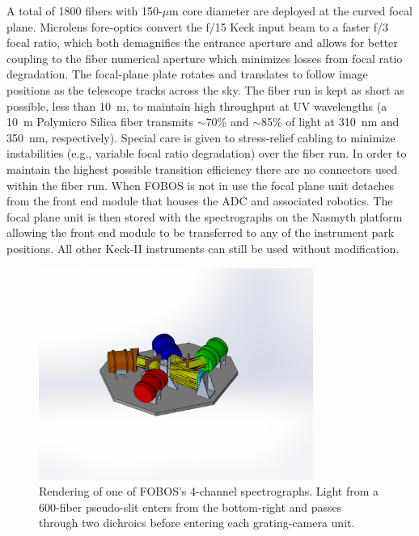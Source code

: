 A total of 1800 fibers with 150-$\mu$m core diameter are deployed at the
curved focal plane. Microlens fore-optics convert the f/15 Keck input
beam to a faster f/3 focal ratio, which both demagnifies the entrance
aperture and allows for better coupling to the fiber numerical aperture
which minimizes losses from focal ratio degradation.  The focal-plane
plate rotates and translates to follow image positions as the telescope
tracks across the sky. The fiber run is kept as short as possible, less
than 10~m, to maintain high throughput at UV wavelengths (a 10~m
Polymicro Silica fiber transmits $\sim$70\% and $\sim$85\% of light at
310~nm and 350~nm, respectively). Special care is given to stress-relief
cabling to minimize instabilities (e.g., variable focal ratio
degradation) over the fiber run. In order to maintain the highest
possible transition efficiency there are no connectors used within the
fiber run.  When FOBOS is not in use the focal plane unit detaches from
the front end module that houses the ADC and associated robotics.  The
focal plane unit is then stored with the spectrographs on the Nasmyth
platform allowing the front end module to be transferred to any of the
instrument park positions.  All other Keck-II instruments can still be
used without modification.

\begin{figure}[h!]
\vskip -0.1in
\includegraphics[width=0.8\textwidth]{figs/FOBOS_SPEC_V2.PDF}
\caption{\small Rendering of one of FOBOS's 4-channel spectrographs.
Light from a 600-fiber pseudo-slit enters from the bottom-right and
passes through two dichroics before entering each grating-camera unit.}
\label{fig:spectrograph}
\end{figure}

